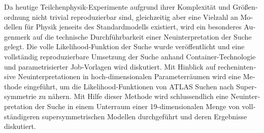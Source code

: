 \begin{otherlanguage}{ngerman}
\begin{zusammenfassung}
Da heutige Teilchenphysik-Experimente aufgrund ihrer Komplexität und Größenordnung nicht trivial reproduzierbar sind, gleichzeitig aber eine Vielzahl an Modellen für Physik jenseits des Standardmodells existiert, wird ein besonderes Augenmerk auf die technische Durchführbarkeit einer Neuinterpretation der Suche gelegt.
Die volle Likelihood-Funktion der Suche wurde veröffentlicht und eine vollständig reproduzierbare Umsetzung der Suche anhand Container-Technologie und parametrisierter Job-Vorlagen wird diskutiert.
Mit Hinblick auf rechenintensive Neuinterpretationen in hoch-dimensionalen Parameter\-räumen wird eine Methode eingeführt, um die Likelihood-Funktionen von ATLAS Suchen nach Supersymmetrie zu nähern.
Mit Hilfe dieser Methode wird schlussendlich eine Neuinterpretation der Suche in einem Unterraum einer 19-dimensionalen Menge von vollständigeren supersymmetrischen Modellen durchgeführt und deren Ergebnisse diskutiert. 

\end{zusammenfassung}
\end{otherlanguage}  

